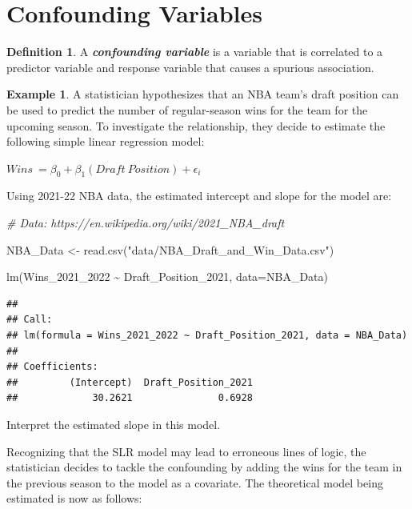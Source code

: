 \documentclass[
  11pt,
]{book}
\newenvironment{Shaded}{\begin{snugshade}}{\end{snugshade}}
\newcommand{\AttributeTok}[1]{\textcolor[rgb]{0.77,0.63,0.00}{#1}}
\newcommand{\CommentTok}[1]{\textcolor[rgb]{0.56,0.35,0.01}{\textit{#1}}}
\newcommand{\FunctionTok}[1]{\textcolor[rgb]{0.00,0.00,0.00}{#1}}
\newcommand{\NormalTok}[1]{#1}
\newcommand{\OtherTok}[1]{\textcolor[rgb]{0.56,0.35,0.01}{#1}}
\newcommand{\SpecialCharTok}[1]{\textcolor[rgb]{0.00,0.00,0.00}{#1}}
\newcommand{\StringTok}[1]{\textcolor[rgb]{0.31,0.60,0.02}{#1}}
\theoremstyle{definition}
\newtheorem{definition}{Definition}[chapter]
\theoremstyle{definition}
\newtheorem{example}{Example}[chapter]
\theoremstyle{definition}
\theoremstyle{definition}
\theoremstyle{remark}
\begin{document}
\hypertarget{confounding-variables}{%
\section{Confounding Variables}\label{confounding-variables}}

\begin{definition}
A \textbf{\emph{confounding variable}} is a variable that is correlated to a predictor variable and response variable that causes a spurious association.
\end{definition}

\begin{example}
A statistician hypothesizes that an NBA team's draft position can be used to predict the number of regular-season wins for the team for the upcoming season. To investigate the relationship, they decide to estimate the following simple linear regression model:

\(Wins\ = \beta_0 + \beta_1(Draft\ Position) + \epsilon_i\)

Using 2021-22 NBA data, the estimated intercept and slope for the model are:

\begin{Shaded}
\begin{Highlighting}[]
\CommentTok{\# Data: https://en.wikipedia.org/wiki/2021\_NBA\_draft}

\NormalTok{NBA\_Data }\OtherTok{\textless{}{-}} \FunctionTok{read.csv}\NormalTok{(}\StringTok{"data/NBA\_Draft\_and\_Win\_Data.csv"}\NormalTok{)}

\FunctionTok{lm}\NormalTok{(Wins\_2021\_2022 }\SpecialCharTok{\textasciitilde{}}\NormalTok{ Draft\_Position\_2021, }\AttributeTok{data=}\NormalTok{NBA\_Data)}
\end{Highlighting}
\end{Shaded}

\begin{verbatim}
## 
## Call:
## lm(formula = Wins_2021_2022 ~ Draft_Position_2021, data = NBA_Data)
## 
## Coefficients:
##         (Intercept)  Draft_Position_2021  
##             30.2621               0.6928
\end{verbatim}

Interpret the estimated slope in this model.
\end{example}

Recognizing that the SLR model may lead to erroneous lines of logic, the statistician decides to tackle the confounding by adding the wins for the team in the previous season to the model as a covariate. The theoretical model being estimated is now as follows:
\end{document}
